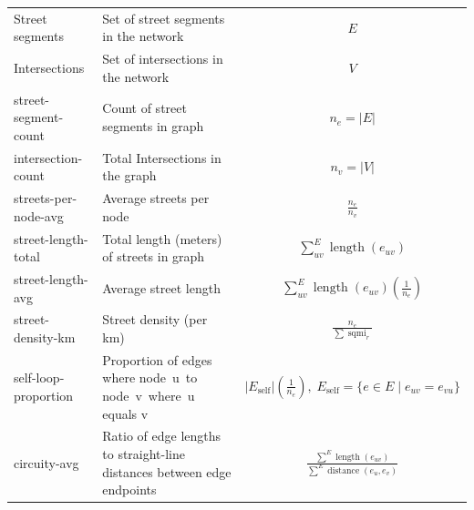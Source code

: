 \documentclass[
  10pt,
]{article}
\begin{document}
\begin{longtable}{l|p{6cm}|c}
\bottomrule
\endlastfoot
   Street segments      &                                                Set of street segments in the network &                                                                                                                $E$ \\
   Intersections      &                                                Set of intersections in the network &                                                                                                                $V$ \\
   street-segment-count &                                                Count of street segments in graph &                                                                                                                $n_e = \left | E \right |$ \\
     intersection-count &                                                 Total Intersections in the graph &                                                                                                                $n_v = \left |V \right |$ \\
   streets-per-node-avg &                                                         Average streets per node &                                                                                                    $\frac{n_e}{n_v}$ \\
    street-length-total &                                        Total length (meters) of streets in graph &                                                                                   $\sum_{uv}^E{\operatorname{length}(e_{uv})}$ \\
      street-length-avg &                                                           Average  street length &                                                        $\sum_{uv}^E{\operatorname{length}(e_{uv})}  \left(\frac{1}{n_e}\right)$ \\
      street-density-km &                                                          Street density (per km) &                                                                            $\frac{n_e}{\sum{\operatorname{sqmi}_r}}$ \\
   self-loop-proportion &                      Proportion of edges where node u to node v where u equals v & $  \vert E_{\mathrm{self}} \vert \left( \frac{1}{n_e} \right) ,\;  E_{\mathrm{self}}= \{e\in E \mid e_{uv}=e_{vu}\}$ \\
           circuity-avg &          Ratio of edge lengths to straight-line distances between edge endpoints &                          $\frac{ \sum^E{\operatorname{length}(e_{uv}) }}{\sum^E{\operatorname{distance}(e_u, e_v)}}$ \\

\end{longtable}
\end{document}
